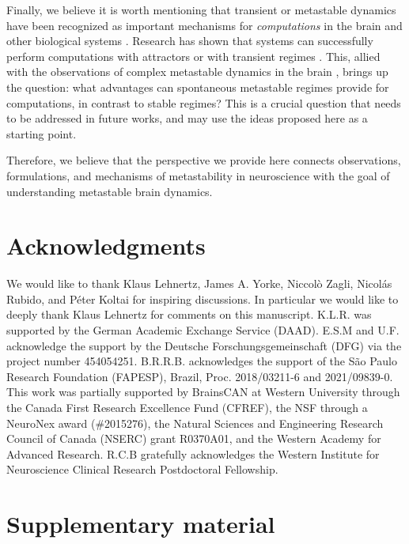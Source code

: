 Finally, we believe it is worth mentioning that transient or metastable dynamics have been recognized as important mechanisms for \textit{computations} in the brain \cite{fonollosa2015learning, lacamera2019cortical, wang202150, laje2013robust, mazor2005transient, sussillo2013opening} and other biological systems \cite{nandan2023non, nandan2022cells}. Research has shown that systems can successfully perform computations with attractors \cite{khona2022attractor} or with transient regimes \cite{mazor2005transient,buonomano2009state, laje2013robust, khona2022attractor, benigno2023waves, budzinski2023an, liboni2023image}. This, allied with the observations of complex metastable dynamics in the brain \cite{brinkman2022metastable}, brings up the question: what advantages can spontaneous metastable regimes provide for computations, in contrast to stable regimes? This is a crucial question that needs to be addressed in future works, and may use the ideas proposed here as a starting point.

Therefore, we believe that the perspective we provide here connects observations, formulations, and mechanisms of metastability in neuroscience with the goal of understanding metastable brain dynamics. 


\section*{Acknowledgments}
We would like to thank Klaus Lehnertz, James A. Yorke, Niccolò Zagli, Nicolás Rubido, and Péter Koltai for inspiring discussions. In particular we would like to deeply thank Klaus Lehnertz for comments on this manuscript. K.L.R. was supported by the German Academic Exchange Service (DAAD). E.S.M and U.F. acknowledge the support by the Deutsche Forschungsgemeinschaft (DFG) via the project number 454054251. B.R.R.B. acknowledges the support of the São Paulo Research Foundation (FAPESP), Brazil, Proc. 2018/03211-6 and 2021/09839-0. This work was partially supported by BrainsCAN at Western University through the Canada First Research Excellence Fund (CFREF), the NSF through a NeuroNex award (\#2015276), the Natural Sciences and Engineering Research Council of Canada (NSERC) grant R0370A01, and the Western Academy for Advanced Research. R.C.B gratefully acknowledges the Western Institute for Neuroscience Clinical Research Postdoctoral Fellowship.

\section*{Supplementary material}

